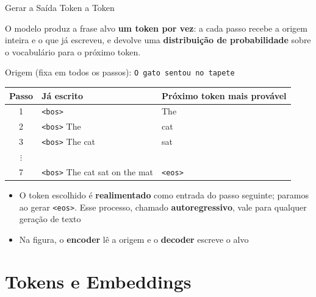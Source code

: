 \documentclass[aspectratio=169,xcolor=dvipsnames]{beamer}
\begin{document}

\begin{frame}[shrink=10]{Gerar a Saída Token a Token}

O modelo produz a frase alvo \textbf{um token por vez}: a cada passo recebe a origem inteira e o que já escreveu, e devolve uma \textbf{distribuição de probabilidade} sobre o vocabulário para o próximo token.

\begin{center}
Origem (fixa em todos os passos): \texttt{O gato sentou no tapete}

\renewcommand{\arraystretch}{1.1}
\begin{tabular}{cll}
\toprule
\textbf{Passo} & \textbf{Já escrito} & \textbf{Próximo token mais provável} \\
\midrule
1 & \texttt{<bos>} & The \\
2 & \texttt{<bos>} The & cat \\
3 & \texttt{<bos>} The cat & sat \\
$\vdots$ & & \\
7 & \texttt{<bos>} The cat sat on the mat & \texttt{<eos>} \\
\bottomrule
\end{tabular}
\end{center}

\begin{itemize}
    \item O token escolhido é \textbf{realimentado} como entrada do passo seguinte; paramos ao gerar \texttt{<eos>}. Esse processo, chamado \textbf{autoregressivo}, vale para qualquer geração de texto
    \item Na figura, o \textbf{encoder} lê a origem e o \textbf{decoder} escreve o alvo
\end{itemize}

\end{frame}

\section{Tokens e Embeddings}
\end{document}
